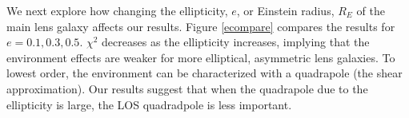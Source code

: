 We next explore how changing the ellipticity, $e$, or Einstein radius, $R_E$ of the main lens galaxy affects our results. Figure \ref{ecompare} compares the results for $e=0.1, 0.3, 0.5$. $\chi^2$ decreases as the ellipticity increases, implying that the environment effects are weaker for more elliptical, asymmetric lens galaxies. To lowest order, the environment can be characterized with a quadrapole (the shear approximation). Our results suggest that when the quadrapole due to the  ellipticity  is large, the LOS quadradpole is less important.
